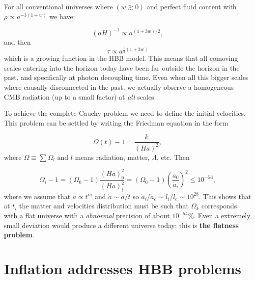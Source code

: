 \documentclass[12pt,letterpaper,twoside]{book}
\begin{document}
For all conventional universes where $(w\gtrsim 0)$ and perfect fluid content
with $\rho \propto a^{-3(1+w)}$ we have:

\begin{equation}
(aH)^{-1} \propto a^{(1+3w)/2},
\end{equation}
%
and then
%
\begin{equation}
\tau \propto a^{\frac12 \left(1+3w\right)}
\end{equation}
which is a growing function in the HBB model. This means
that all comoving scales entering into the horizon today have been far outside
the horizon in the past, and specifically at photon decoupling time. Even when
all this bigger scales where causally disconnected in the past, we actually
observe a homogeneous CMB radiation (up to a small factor) at \textit{all}
scales.

To achieve the complete Cauchy problem we need to define the initial velocities.
This problem can be settled by writing the Friedman equation in the form

\begin{equation}
    \Omega(t)-1=\frac{k}{(Ha)^2},
\end{equation}
where $\Omega \equiv \sum \Omega_l$ and $l$ means radiation, matter, $\Lambda$,
etc. Then

\begin{equation}\label{ec_cond_flatness}
    \Omega_i-1=(\Omega_0-1)\frac{(Ha)^2_0}{(Ha)^2_i}=
    (\Omega_0-1)\left(\frac{\dot{a}_0}{\dot{a}_i}\right)^2\leq 10^{-56},
\end{equation}
where we assume that $a\propto t^m$ and $\dot{a} \sim a/t$ so
$\dot{a}_i/\dot{a}_c  \sim l_i/l_c \sim 10^{28}$. This shows that at $t_i$ the
matter and velocities distribution must be such that $\Omega_k$ corresponds with
a flat universe with a \textit{abnormal} precision of about $10^{-54} \%$. Even a
extremely small deviation would produce a different universe today; this is
\textbf{the flatness problem}.


\section{Inflation addresses HBB problems} \label{sec:inflation}
\end{document}
